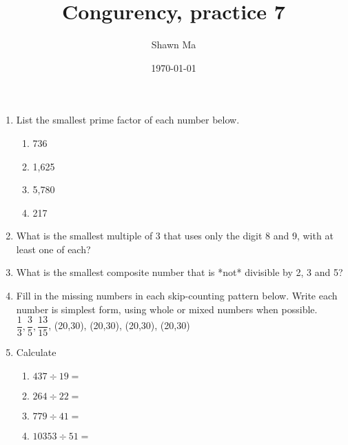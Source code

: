 \documentclass[letterpaper,12pt]{article}
\author{Shawn Ma}
\date{\today}
\title{Congurency, practice 7}
\begin{document}
\setlength{\parindent}{0pt}

\begin{enumerate}
\item List the smallest prime factor of each number below.
\begin{multicols}{2}

\begin{enumerate}
    \item 736
    \item 1,625
    \item 5,780
    \item 217
\end{enumerate}
\end{multicols}

\item What is the smallest multiple of 3 that uses only the digit
8 and 9, with at least one of each?
\vspace{1cm}

\item What is the smallest composite number that is *not* divisible by 2, 3 and 5?
\vspace{1cm}

\item Fill in the missing numbers in each skip-counting pattern below. Write each
number is simplest form, using whole or mixed numbers when possible.\\
$\dfrac{1}{3}, \dfrac{3}{5}, \dfrac{13}{15}$, \framebox(20,30){}, \framebox(20,30){}, \framebox(20,30){}, \framebox(20,30){}


\item Calculate
\begin{enumerate}
    \item $437\div 19=$
    \item $264\div 22=$
    \item $779\div 41=$
    \item $10353\div 51=$
    \end{enumerate}

\end{enumerate}
\end{document}
